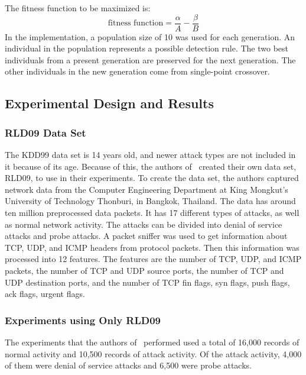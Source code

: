 \documentclass{sig-alternate}
\begin{document}
The fitness function to be maximized is:
\begin{equation*}
\textrm{fitness function} = \frac{\alpha}{A} - \frac{\beta}{B}
\end{equation*}
In the implementation, a population size of 10 was used for each generation. An individual in the population represents a possible detection rule. The two best individuals from a present generation are preserved for the next generation. The other individuals in the new generation come from single-point crossover.




\subsection{Experimental Design and Results}

\subsubsection{RLD09 Data Set}
The KDD99 data set is 14 years old, and newer attack types are not included in it because of its age. Because of this, the authors of~\cite{6496342, 6559603} created their own data set, RLD09, to use in their experiments. To create the data set, the authors captured network data from the Computer Engineering Department at King Mongkut's University of Technology Thonburi, in Bangkok, Thailand. The data has around ten million preprocessed data packets. It has 17 different types of attacks, as well as normal network activity. The attacks can be divided into denial of service attacks and probe attacks. A packet sniffer was used to get information about TCP, UDP, and ICMP headers from protocol packets. Then this information was processed into 12 features. The features are the number of TCP, UDP, and ICMP packets, the number of TCP and UDP source ports, the number of TCP and UDP destination ports, and the number of TCP fin flags, syn flags, push flags, ack flags, urgent flags.




\subsubsection{Experiments using Only RLD09}
The experiments that the authors of~\cite{6496342, 6559603} performed used a total of 16,000 records of normal activity and 10,500 records of attack activity. Of the attack activity, 4,000 of them were denial of service attacks and 6,500 were probe attacks.
\end{document}
